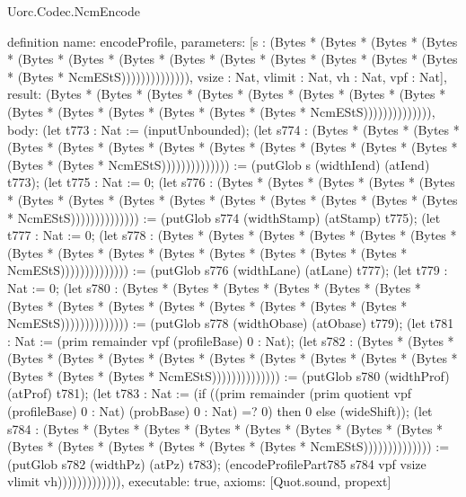 \begin{lexlean}{Uorc.Codec.NcmEncode}
\begin{semanticmodule}
definition{
  name: encodeProfile,
  parameters: [s : (Bytes * (Bytes * (Bytes * (Bytes * (Bytes * (Bytes * (Bytes * (Bytes * (Bytes * (Bytes * (Bytes * (Bytes * (Bytes * (Bytes * NcmEStS)))))))))))))), vsize : Nat, vlimit : Nat, vh : Nat, vpf : Nat],
  result: (Bytes * (Bytes * (Bytes * (Bytes * (Bytes * (Bytes * (Bytes * (Bytes * (Bytes * (Bytes * (Bytes * (Bytes * (Bytes * (Bytes * NcmEStS)))))))))))))),
  body: (let t773 : Nat := (inputUnbounded); (let s774 : (Bytes * (Bytes * (Bytes * (Bytes * (Bytes * (Bytes * (Bytes * (Bytes * (Bytes * (Bytes * (Bytes * (Bytes * (Bytes * (Bytes * NcmEStS)))))))))))))) := (putGlob s (widthIend) (atIend) t773); (let t775 : Nat := 0; (let s776 : (Bytes * (Bytes * (Bytes * (Bytes * (Bytes * (Bytes * (Bytes * (Bytes * (Bytes * (Bytes * (Bytes * (Bytes * (Bytes * (Bytes * NcmEStS)))))))))))))) := (putGlob s774 (widthStamp) (atStamp) t775); (let t777 : Nat := 0; (let s778 : (Bytes * (Bytes * (Bytes * (Bytes * (Bytes * (Bytes * (Bytes * (Bytes * (Bytes * (Bytes * (Bytes * (Bytes * (Bytes * (Bytes * NcmEStS)))))))))))))) := (putGlob s776 (widthLane) (atLane) t777); (let t779 : Nat := 0; (let s780 : (Bytes * (Bytes * (Bytes * (Bytes * (Bytes * (Bytes * (Bytes * (Bytes * (Bytes * (Bytes * (Bytes * (Bytes * (Bytes * (Bytes * NcmEStS)))))))))))))) := (putGlob s778 (widthObase) (atObase) t779); (let t781 : Nat := (prim remainder vpf (profileBase) 0 : Nat); (let s782 : (Bytes * (Bytes * (Bytes * (Bytes * (Bytes * (Bytes * (Bytes * (Bytes * (Bytes * (Bytes * (Bytes * (Bytes * (Bytes * (Bytes * NcmEStS)))))))))))))) := (putGlob s780 (widthProf) (atProf) t781); (let t783 : Nat := (if ((prim remainder (prim quotient vpf (profileBase) 0 : Nat) (probBase) 0 : Nat) =? 0) then 0 else (wideShift)); (let s784 : (Bytes * (Bytes * (Bytes * (Bytes * (Bytes * (Bytes * (Bytes * (Bytes * (Bytes * (Bytes * (Bytes * (Bytes * (Bytes * (Bytes * NcmEStS)))))))))))))) := (putGlob s782 (widthPz) (atPz) t783); (encodeProfilePart785 s784 vpf vsize vlimit vh))))))))))))),
  executable: true,
  axioms: [Quot.sound, propext]
}


\end{semanticmodule}
\end{lexlean}
